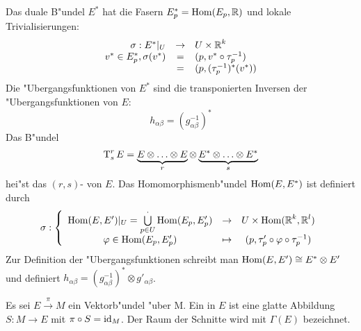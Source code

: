 Das duale B"undel $E^*$ hat die Fasern $E_p^* = \operatorname{Hom}(E_p, \operatorname{\mathbb{R}})$ und lokale Trivialisierungen:
	\[ \begin{array}{rcl} \sigma: E^*|_U &\to& U \times \operatorname{\mathbb{R}}^k\\
	v^* \in E^*_p, \sigma(v^*) &=& (p, v^* \circ \tau_p^{-1}) \\
	&=& (p, (\tau_p^{-1})^*(v^*)) \end{array}\]
Die "Ubergangsfunktionen von $E^*$ sind die transponierten Inversen der "Ubergangsfunktionen von $E$:
	\[ h_{\alpha\beta} = (g_{\alpha\beta}^{-1})^* \]
Das B"undel
	\[ \operatorname{T}_s^r E = \underbrace{E \otimes \ldots \otimes E}_{r} \otimes \underbrace{E^* \otimes \ldots \otimes E^*}_{s} \]
hei"st das $(r,s)$- von $E$. Das Homomorphismenb"undel $\operatorname{Hom}(E,E^*)$ ist definiert durch
	\[ \sigma: \left\{ \begin{array}{ccc} \operatorname{Hom}(E,E')|_U = \bigcup\limits_{p \in U}^{\cdot} \operatorname{Hom}(E_p, E_p') &\to& U \times \operatorname{Hom}(\operatorname{\mathbb{R}}^k, \operatorname{\mathbb{R}}^l)\\
		\varphi \in \operatorname{Hom}(E_p, E'_p) &\mapsto& (p, \tau'_p \circ \varphi \circ \tau_p^{-1}) \end{array} \right. \]
Zur Definition der "Ubergangsfunktionen schreibt man $\operatorname{Hom}(E, E') \cong E^* \otimes E'$ und definiert $h_{\alpha\beta} = (g_{\alpha\beta}^{-1})^* \otimes g'_{\alpha\beta}$.
\begin{center}\end{center}

\begin{Dfn}
Es sei $E \xrightarrow{\pi} M$ ein Vektorb"undel "uber M. Ein  in $E$ ist eine glatte Abbildung $S: M \to E$ mit $\pi \circ S = \operatorname{id}_M$. Der Raum der Schnitte wird mit $\Gamma(E)$ bezeichnet.
\end{Dfn}
